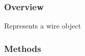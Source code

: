 \documentclass[letterpaper,10pt,english,openany,oneside]{sphinxmanual}
\begin{document}
\subsubsection{Overview}
\label{\detokenize{reference/classes/wire:overview}}

\begin{fulllineitems}
\label{\detokenize{reference/classes/wire:spydrnet.Wire}}
Represents a wire object

\end{fulllineitems}



\subsubsection{Methods}
\label{\detokenize{reference/classes/wire:methods}}
\end{document}
